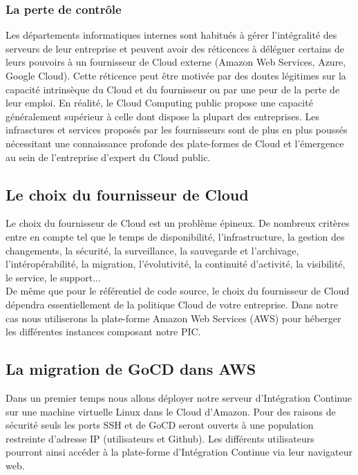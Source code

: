         \subsubsection{La perte de contrôle}
        Les départements informatiques internes sont habitués à gérer l'intégralité des serveurs de leur entreprise et peuvent avoir des réticences à déléguer certains de leurs pouvoirs à un fournisseur de Cloud externe (Amazon Web Services, Azure, Google Cloud). Cette réticence peut être motivée par des doutes légitimes sur la capacité intrinsèque du Cloud et du fournisseur ou par une peur de la perte de leur emploi. En réalité, le Cloud Computing public propose une capacité généralement supérieur à celle dont dispose la plupart des entreprises. Les infrasctures et services proposés par les fournisseurs sont de plus en plus poussés nécessitant une connaissance profonde des plate-formes de Cloud et l'émergence au sein de l'entreprise d'expert du Cloud public.

      \subsection{Le choix du fournisseur de Cloud}
      Le choix du fournisseur de Cloud est un problème épineux. De nombreux critères entre en compte tel que le temps de disponibilité, l'infrastructure, la gestion des changements, la sécurité, la surveillance, la sauvegarde et l'archivage, l'intéropérabilité, la migration, l'évolutivité, la continuité d'activité, la visibilité, le service, le support...\\

      De même que pour le référentiel de code source, le choix du fournisseur de Cloud dépendra essentiellement de la politique Cloud de votre entreprise. Dans notre cas nous utiliserons la plate-forme Amazon Web Services (AWS) pour héberger les différentes instances composant notre PIC.

      \subsection{La migration de GoCD dans AWS}
      Dans un premier temps nous allons déployer notre serveur d'Intégration Continue sur une machine virtuelle Linux dans le Cloud d'Amazon. Pour des raisons de sécurité seuls les ports SSH et de GoCD seront ouverts à une population restreinte d'adresse IP (utilisateurs et Github). Les différents utilisateurs pourront ainsi accéder à la plate-forme d'Intégration Continue via leur navigateur web.\\

